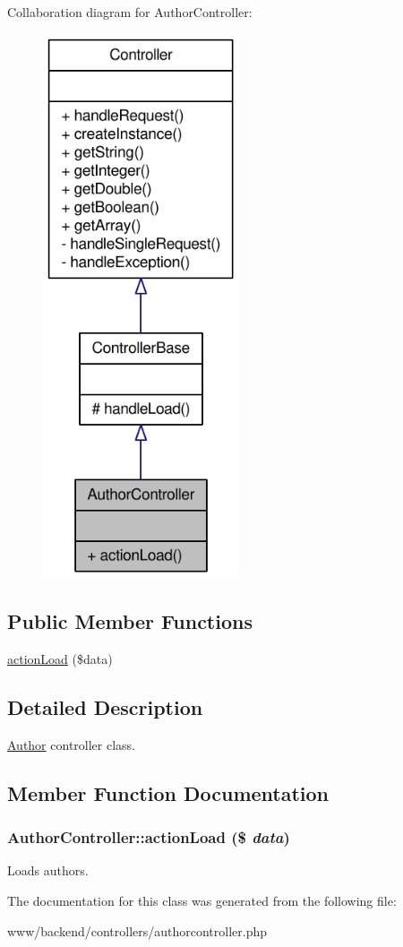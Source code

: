 Collaboration diagram for AuthorController:\nopagebreak
\begin{figure}[H]
\begin{center}
\leavevmode
\includegraphics[width=164pt]{classAuthorController__coll__graph}
\end{center}
\end{figure}
\subsection*{Public Member Functions}
\begin{DoxyCompactItemize}
\item 
\hyperlink{classAuthorController_ab1c7d40c980ba7cffe80d02eff43f225}{actionLoad} (\$data)
\end{DoxyCompactItemize}


\subsection{Detailed Description}
\hyperlink{classAuthor}{Author} controller class. 

\subsection{Member Function Documentation}
\hypertarget{classAuthorController_ab1c7d40c980ba7cffe80d02eff43f225}{
\subsubsection[{actionLoad}]{\setlength{\rightskip}{0pt plus 5cm}AuthorController::actionLoad (\$ {\em data})}}
\label{classAuthorController_ab1c7d40c980ba7cffe80d02eff43f225}
Loads authors. 

The documentation for this class was generated from the following file:\begin{DoxyCompactItemize}
\item 
www/backend/controllers/authorcontroller.php\end{DoxyCompactItemize}
